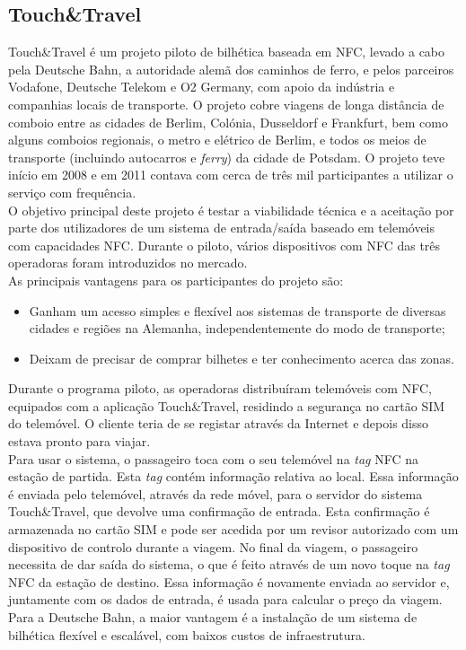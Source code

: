 \subsection{Touch\&Travel}

Touch\&Travel é um projeto piloto de bilhética baseada em NFC, levado a cabo pela Deutsche Bahn, a autoridade alemã dos caminhos de ferro, e pelos parceiros Vodafone, Deutsche Telekom e O2 Germany, com apoio da indústria e companhias locais de transporte. O projeto cobre viagens de longa distância de comboio entre as cidades de Berlim, Colónia, Dusseldorf e Frankfurt, bem como alguns comboios regionais, o metro e elétrico de Berlim, e todos os meios de transporte (incluindo autocarros e \textit{ferry}) da cidade de Potsdam. O projeto teve início em 2008 e em 2011 contava com cerca de três mil participantes a utilizar o serviço com frequência.
\\O objetivo principal deste projeto é testar a viabilidade técnica e a aceitação por parte dos utilizadores de um sistema de entrada/saída baseado em telemóveis com capacidades NFC. Durante o piloto, vários dispositivos com NFC das três operadoras foram introduzidos no mercado.
\\As principais vantagens para os participantes do projeto são:
\begin{itemize}
\item Ganham um acesso simples e flexível aos sistemas de transporte de diversas cidades e regiões na Alemanha, independentemente do modo de transporte;
\item Deixam de precisar de comprar bilhetes e ter conhecimento acerca das zonas.
\end{itemize}

Durante o programa piloto, as operadoras distribuíram telemóveis com NFC, equipados com a aplicação Touch\&Travel, residindo a segurança no cartão SIM do telemóvel. O cliente teria de se registar através da Internet e depois disso estava pronto para viajar.
\\Para usar o sistema, o passageiro toca com o seu telemóvel na \textit{tag} NFC na estação de partida. Esta \textit{tag} contém informação relativa ao local. Essa informação é enviada pelo telemóvel, através da rede móvel, para o servidor do sistema Touch\&Travel, que devolve uma confirmação de entrada. Esta confirmação é armazenada no cartão SIM e pode ser acedida por um revisor autorizado com um dispositivo de controlo durante a viagem. No final da viagem, o passageiro necessita de dar saída do sistema, o que é feito através de um novo toque na \textit{tag} NFC da estação de destino. Essa informação é novamente enviada ao servidor e, juntamente com os dados de entrada, é usada para calcular o preço da viagem.
\\Para a Deutsche Bahn, a maior vantagem é a instalação de um sistema de bilhética flexível e escalável, com baixos custos de infraestrutura.\cite{NFCForum2011}

